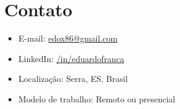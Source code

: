 \documentclass[11pt,a4paper,sans]{moderncv}
\begin{document}
\section{Contato}
\begin{itemize}
\item E-mail: \href{mailto:edox86@gmail.com}{edox86@gmail.com}
\item LinkedIn: \href{https://www.linkedin.com/in/eduardofranca/}{/in/eduardofranca}
\item Localização: Serra, ES, Brasil
\item Modelo de trabalho: Remoto ou presencial
\end{itemize}
\end{document}
